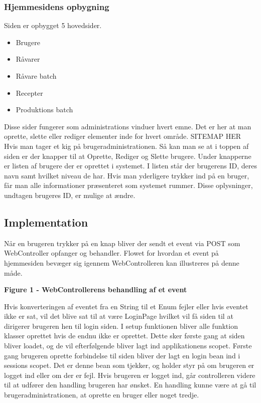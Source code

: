 \documentclass[a4paper]{article}
\begin{document}

\subsubsection{Hjemmesidens opbygning} %

Siden er opbygget 5 hovedsider. 
\begin{itemize}
  \item Brugere
  \item Råvarer
  \item Råvare batch
  \item Recepter
  \item Produktions batch
\end{itemize}

Disse sider fungerer som administrations vinduer hvert emne.  Det er her at man oprette, slette eller rediger elementer inde for hvert område. 
SITEMAP HER
Hvis man tager et kig på brugeradministrationen. Så kan man se at i toppen af siden er der knapper til at Oprette, Rediger og Slette brugere. Under knapperne er listen af brugere der er oprettet i systemet. I listen står der brugerens ID, deres navn samt hvilket niveau de har. Hvis man yderligere trykker ind på en bruger, får man alle informationer præsenteret som systemet rummer.  Disse oplysninger, undtagen brugeres ID, er mulige at ændre. 



\subsection{Implementation} %

Når en brugeren trykker på en knap bliver der sendt et event via POST som WebController opfanger og behandler. Flowet for hvordan et event på hjemmesiden bevæger sig igennem WebControlleren kan illustreres på denne måde. 
 
\begin{center}
  \textbf{ Figure 1 - WebControllerens behandling af et event }
\end{center}

Hvis konverteringen af  eventet fra en String til et Enum fejler eller hvis eventet ikke er sat, vil det blive sat til at være LoginPage hvilket vil få siden til at dirigerer brugeren hen til login siden. I setup funktionen bliver alle funktion klasser oprettet hvis de endnu ikke er oprettet. Dette sker første gang at siden bliver loadet, og de vil efterfølgende bliver lagt ind applikationens scopet. Første gang brugeren oprette forbindelse til siden bliver der lagt en login bean ind i sessions scopet. Det er denne bean som tjekker, og holder styr på om brugeren er logget ind eller om der er fejl. Hvis brugeren er logget ind, går controlleren videre til at udfører den handling brugeren har ønsket. En handling kunne være at gå til brugeradministrationen, at oprette en bruger eller noget tredje. 
\end{document}
